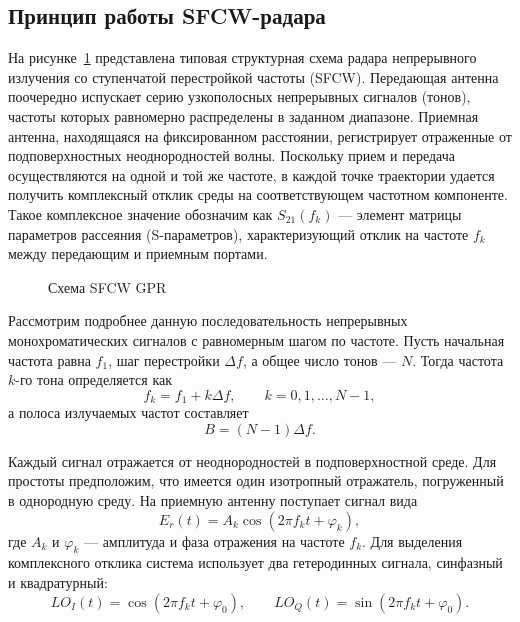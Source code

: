 \subsection{Принцип работы SFCW-радара}

На рисунке~\ref{fig:sfcw-gpr-placeholder} представлена типовая структурная схема радара непрерывного излучения со ступенчатой перестройкой частоты (SFCW). Передающая антенна поочередно испускает серию узкополосных непрерывных сигналов (тонов), частоты которых равномерно распределены в заданном диапазоне. Приемная антенна, находящаяся на фиксированном расстоянии, регистрирует отраженные от подповерхностных неоднородностей волны. Поскольку прием и передача осуществляются на одной и той же частоте, в каждой точке траектории удается получить комплексный отклик среды на соответствующем частотном компоненте. Такое комплексное значение обозначим как $S_{21}(f_k)$ --- элемент матрицы параметров рассеяния (S-параметров), характеризующий отклик на частоте $f_k$ между передающим и приемным портами.

\begin{figure}[H]
    \centering
    \caption{Схема SFCW GPR}
    \label{fig:sfcw-gpr-placeholder}
\end{figure}

Рассмотрим подробнее данную последовательность непрерывных монохроматических сигналов с равномерным шагом по частоте. Пусть начальная частота равна $f_1$, шаг перестройки $\Delta f$, а общее число тонов --- $N$. Тогда частота $k$-го тона определяется как
\begin{equation}
    f_k = f_1 + k \Delta f,\qquad k = 0, 1, \ldots, N - 1,
\end{equation}
а полоса излучаемых частот составляет
\begin{equation}
    B = (N - 1) \Delta f.
\end{equation}

Каждый сигнал отражается от неоднородностей в подповерхностной среде. Для простоты предположим, что имеется один изотропный отражатель, погруженный в однородную среду. На приемную антенну поступает сигнал вида
\begin{equation}
    E_r(t) = A_k \cos \left(2 \pi f_k t + \varphi_k\right),
\end{equation}
где $A_k$ и $\varphi_k$ --- амплитуда и фаза отражения на частоте $f_k$. Для выделения комплексного отклика система использует два гетеродинных сигнала, синфазный и квадратурный:
\begin{equation}
    LO_I(t) = \cos \left(2 \pi f_k t + \varphi_0\right), \qquad
    LO_Q(t) = \sin \left(2 \pi f_k t + \varphi_0\right).
\end{equation}

